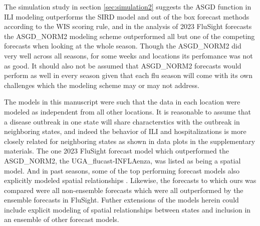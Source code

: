 The simulation study in section \ref{sec:simulation2} suggests the ASGD 
function in ILI modeling outperforms the SIRD model and out of the box 
forecast methods according to 
the WIS scoring rule, and in the analysis of 2023 FluSight forecasts the 
ASGD\_NORM2 modeling scheme outperformed all but one of the competing
forecasts when looking at the whole season. Though the ASGD\_NORM2 did very 
well across all seasons, for some weeks and locations its perfomance was not
as good. It should also not be assumed that ASGD\_NORM2 forecasts would perform
as well in every season given that each flu season will come with its own
challenges which the modeling scheme may or may not address.

The models in this manuscript were such that the data in each
location were modeled as
independent from all other locations. It is reasonable to assume that a
disease outbreak in one state will share characterstics with the outbreak in 
neighboring states, and indeed the behavior of ILI and hospitalizations is more
closely related for neighboring states as shown in data plots in the
supplementary materials. The one 2023 FluSight forecast model which outperformed
the ASGD\_NORM2, the UGA\_flucast-INFLAenza, was listed as being a spatial
model. And in past seasons, some of the top performing forecast models also 
explicitly modeled spatial relationships \cite[]{osthus2021multiscale}.
Likewise, the forecasts to which ours was compared were all non-ensemble 
forecasts which were all outperformed by the ensemble forecasts in FluSight.
Futher extensions of the models herein could include explicit modeling of 
spatial relationships between states and inclusion in an ensemble of other
forecast models.
